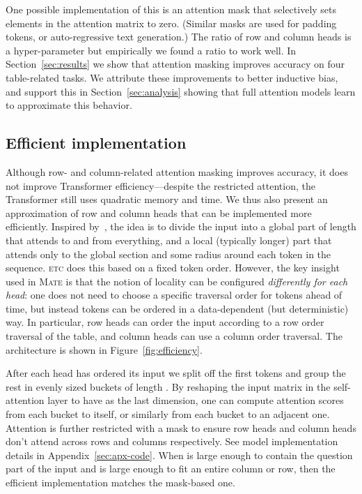 \documentclass[11pt]{article}
\newcommand{\etc}{\textsc{etc}\xspace}
\newcommand{\model}{\textsc{Mate}\xspace}
\begin{document}
One possible implementation of this is an attention mask that selectively sets elements in the attention matrix to zero. (Similar masks are used for padding tokens, or auto-regressive text generation.) 
The ratio of row and column
heads is a hyper-parameter but empirically we found a  ratio to work well.
In Section~\ref{sec:results}
we show that attention masking improves accuracy on four table-related tasks.
We attribute these improvements to better inductive bias, and support this in Section~\ref{sec:analysis} showing that full attention models learn to approximate this behavior.

\subsection{Efficient implementation}

Although row- and column-related attention masking improves accuracy, it does not improve Transformer efficiency---despite the restricted attention, the Transformer still uses quadratic memory and time.  We thus also present an approximation of row and column heads that can be implemented more efficiently.
Inspired by~\citet{ainslie-etal-2020-etc}, the idea is to divide the input into
a global part of length  that attends to and from everything, and a local (typically longer) part that attends only to the global section and some radius  around each token in the  sequence. 
\etc does this based on a fixed token order.
However, the key insight used in \model is that the notion of locality can be configured \textit{differently for each head}: one does not need to choose a specific traversal order for tokens ahead of time, but instead tokens can be ordered in a data-dependent (but deterministic) way.
In particular, row heads can order the input according to a row order traversal of the table, and column heads can use a column order traversal.
The architecture is shown in Figure~\ref{fig:efficiency}.

After each head has ordered its input we split off the first  tokens and group the rest in evenly sized buckets of length .
By reshaping the input matrix in the self-attention layer to have  as the last dimension,
one can compute attention scores from each bucket to itself, or similarly from each bucket to an adjacent one.
Attention is further restricted with a mask to ensure row heads and column heads don't attend across rows and columns respectively. See model implementation details in Appendix~\ref{sec:apx-code}.
When  is large enough to contain the question part of the input and  is large enough to fit an entire column or row, then the efficient implementation matches the mask-based one.
\end{document}
